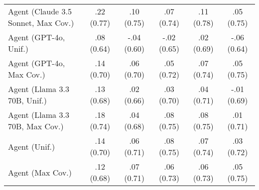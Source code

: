 \begin{table}[h!]
\begin{tabular}{lccccc}
    Agent (Claude 3.5 Sonnet, Max Cov.) & \cellcolor{gold!30}.22 {\small (0.77)} & \cellcolor{bronze!30}.10 {\small (0.75)} & .07 {\small (0.74)} & \cellcolor{gold!30}.11 {\small (0.78)} & .05 {\small (0.75)} \\
    Agent (GPT-4o, Unif.) & .08 {\small (0.64)} & -.04 {\small (0.60)} & -.02 {\small (0.65)} & .02 {\small (0.69)} & -.06 {\small (0.64)} \\
    Agent (GPT-4o, Max Cov.) & .14 {\small (0.70)} & .06 {\small (0.70)} & .05 {\small (0.72)} & .07 {\small (0.74)} & .05 {\small (0.75)} \\
    Agent (Llama 3.3 70B, Unif.) & .13 {\small (0.68)} & .02 {\small (0.66)} & .03 {\small (0.70)} & .04 {\small (0.71)} & -.01 {\small (0.69)} \\
    Agent (Llama 3.3 70B, Max Cov.) & .18 {\small (0.74)} & .04 {\small (0.68)} & .08 {\small (0.75)} & .08 {\small (0.75)} & .01 {\small (0.71)} \\
    Agent (Unif.) & .14 {\small (0.70)} & .06 {\small (0.71)} & .08 {\small (0.75)} & .07 {\small (0.74)} & .03 {\small (0.72)} \\
    Agent (Max Cov.) & .12 {\small (0.68)} & .07 {\small (0.71)} & .06 {\small (0.73)} & .06 {\small (0.73)} & .05 {\small (0.75)} \\
    \bottomrule
    \end{tabular}
\end{table}